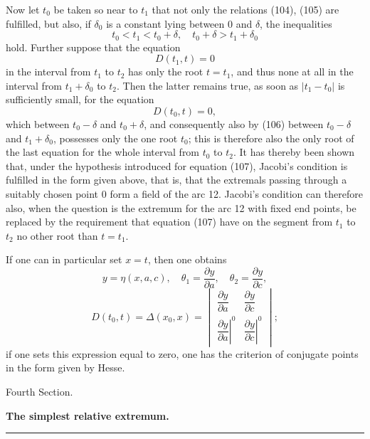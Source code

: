 \documentclass[11pt,a4paper,leqno]{article}
\begin{document}
Now let $t_0$ be taken so near to $t_1$ that not only the relations (104), (105) are fulfilled, but also, if $\delta_0$ is a constant lying between 0 and $\delta$, the inequalities
\begin{equation}\tag{106}
t_0<t_1<t_0+\delta,
\quad
t_0+\delta>t_1+\delta_0
\end{equation}
hold. Further suppose that the equation
\begin{equation}\tag{107}
D(t_1,t)=0
\end{equation}
in the interval from $t_1$ to $t_2$ has only the root $t=t_1$, and thus none at all in the interval from $t_1+\delta_0$ to $t_2$. Then the latter remains true, as soon as $|t_1-t_0|$ is sufficiently small, for the equation
\[
D(t_0,t)=0,
\]
which between $t_0-\delta$ and $t_0+\delta$, and consequently also by (106) between $t_0-\delta$ and $t_1+\delta_0$, possesses only the one root $t_0$; this is therefore also the only root of the last equation for the whole interval from $t_0$ to $t_2$. It has thereby been shown that, under the hypothesis introduced for equation (107), Jacobi's condition is fulfilled in the form given above, that is, that the extremals passing through a suitably chosen point 0 form a field of the arc 12. Jacobi's condition can therefore also, when the question is the extremum for the arc 12 with fixed end points, be replaced by the requirement that equation (107) have on the segment from $t_1$ to $t_2$ no other root than $t=t_1$.

If one can in particular set $x=t$, then one obtains
\[
y=\eta(x,a,c),
\quad
\theta_1=\frac{\partial y}{\partial a},
\quad
\theta_2=\frac{\partial y}{\partial c},
\]
\[
D(t_0,t)=\Delta(x_0,x)=
\begin{vmatrix}
\dfrac{\partial y}{\partial a}&\dfrac{\partial y}{\partial c}\\[1.2ex]
\left.\dfrac{\partial y}{\partial a}\right|^0&
\left.\dfrac{\partial y}{\partial c}\right|^0
\end{vmatrix};
\]
if one sets this expression equal to zero, one has the criterion of conjugate points in the form given by Hesse.



\begin{center}
{\large Fourth Section.}\par
\vspace{4mm}
{\Large\bfseries The simplest relative extremum.}\par
\vspace{2mm}\rule{26mm}{0.4pt}\par
\end{center}
\end{document}
